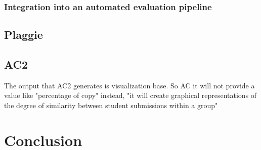 \documentclass[a4paper, 11pt]{article}
\renewcommand{\\}{\vspace*{0.5\baselineskip} \newline}
\begin{document}
\subsubsection{Integration into an automated evaluation pipeline}

\subsection{Plaggie}

\subsection{AC2}

The output that AC2 generates is visualization base. So AC it will not provide a value like "percentage of copy" instead, "it will create graphical representations of the degree of similarity between student submissions within a group" \autocite{AC2}   

\section{Conclusion}

\newpage

\printbibliography[
	heading=bibintoc,
	title={References}
]

\appendix
\end{document}
